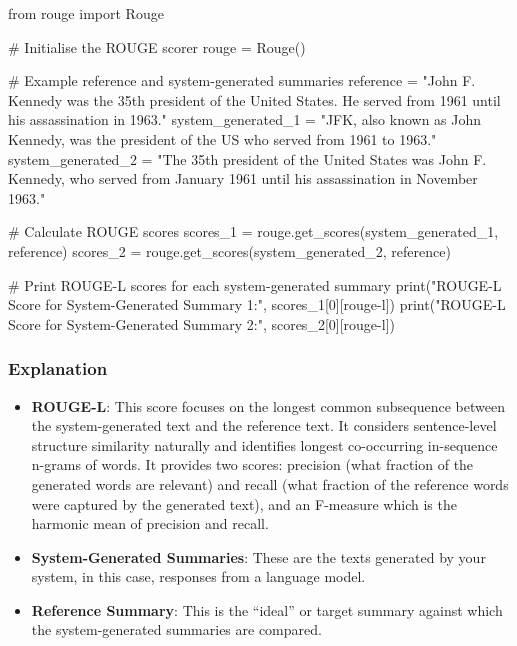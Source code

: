 \documentclass[
]{agujournal2019}
\newenvironment{Shaded}{\begin{snugshade}}{\end{snugshade}}
\newcommand{\BuiltInTok}[1]{\textcolor[rgb]{0.00,0.23,0.31}{#1}}
\newcommand{\CommentTok}[1]{\textcolor[rgb]{0.37,0.37,0.37}{#1}}
\newcommand{\DecValTok}[1]{\textcolor[rgb]{0.68,0.00,0.00}{#1}}
\newcommand{\ImportTok}[1]{\textcolor[rgb]{0.00,0.46,0.62}{#1}}
\newcommand{\NormalTok}[1]{\textcolor[rgb]{0.00,0.23,0.31}{#1}}
\newcommand{\OperatorTok}[1]{\textcolor[rgb]{0.37,0.37,0.37}{#1}}
\newcommand{\StringTok}[1]{\textcolor[rgb]{0.13,0.47,0.30}{#1}}
\begin{document}
\begin{Shaded}
\begin{Highlighting}[]
\ImportTok{from}\NormalTok{ rouge }\ImportTok{import}\NormalTok{ Rouge}

\CommentTok{\# Initialise the ROUGE scorer}
\NormalTok{rouge }\OperatorTok{=}\NormalTok{ Rouge()}

\CommentTok{\# Example reference and system{-}generated summaries}
\NormalTok{reference }\OperatorTok{=} \StringTok{"John F. Kennedy was the 35th president of the United States. He served from 1961 until his assassination in 1963."}
\NormalTok{system\_generated\_1 }\OperatorTok{=} \StringTok{"JFK, also known as John Kennedy, was the president of the US who served from 1961 to 1963."}
\NormalTok{system\_generated\_2 }\OperatorTok{=} \StringTok{"The 35th president of the United States was John F. Kennedy, who served from January 1961 until his assassination in November 1963."}

\CommentTok{\# Calculate ROUGE scores}
\NormalTok{scores\_1 }\OperatorTok{=}\NormalTok{ rouge.get\_scores(system\_generated\_1, reference)}
\NormalTok{scores\_2 }\OperatorTok{=}\NormalTok{ rouge.get\_scores(system\_generated\_2, reference)}

\CommentTok{\# Print ROUGE{-}L scores for each system{-}generated summary}
\BuiltInTok{print}\NormalTok{(}\StringTok{"ROUGE{-}L Score for System{-}Generated Summary 1:"}\NormalTok{, scores\_1[}\DecValTok{0}\NormalTok{][}\StringTok{\textquotesingle{}rouge{-}l\textquotesingle{}}\NormalTok{])}
\BuiltInTok{print}\NormalTok{(}\StringTok{"ROUGE{-}L Score for System{-}Generated Summary 2:"}\NormalTok{, scores\_2[}\DecValTok{0}\NormalTok{][}\StringTok{\textquotesingle{}rouge{-}l\textquotesingle{}}\NormalTok{])}
\end{Highlighting}
\end{Shaded}

\subsubsection{Explanation}\label{explanation}

\begin{itemize}
\item
  \textbf{ROUGE-L}: This score focuses on the longest common subsequence
  between the system-generated text and the reference text. It considers
  sentence-level structure similarity naturally and identifies longest
  co-occurring in-sequence n-grams of words. It provides two scores:
  precision (what fraction of the generated words are relevant) and
  recall (what fraction of the reference words were captured by the
  generated text), and an F-measure which is the harmonic mean of
  precision and recall.
\item
  \textbf{System-Generated Summaries}: These are the texts generated by
  your system, in this case, responses from a language model.
\item
  \textbf{Reference Summary}: This is the ``ideal'' or target summary
  against which the system-generated summaries are compared.
\end{itemize}
\end{document}

